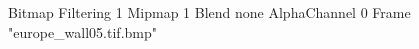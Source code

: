{Bitmap
	{Filtering 1}
	{Mipmap 1}
	{Blend none}
	{AlphaChannel 0}
	{Frame "europe_wall05.tif.bmp"}
}
